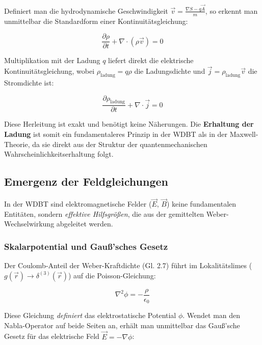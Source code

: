 Definiert man die hydrodynamische Geschwindigkeit $\vec{v} = \frac{\nabla S - q\vec{A}}{m}$, so erkennt man unmittelbar die Standardform einer Kontinuitätsgleichung:

\begin{equation}
    \frac{\partial \rho}{\partial t} + \nabla \cdot (\rho \vec{v}) = 0
\end{equation}

Multiplikation mit der Ladung $q$ liefert direkt die elektrische Kontinuitätsgleichung, wobei $\rho_{\text{ladung}} = q\rho$ die Ladungsdichte und $\vec{j} = \rho_{\text{ladung}} \vec{v}$ die Stromdichte ist:

\begin{equation}
    \frac{\partial \rho_{\text{ladung}}}{\partial t} + \nabla \cdot \vec{j} = 0
\end{equation}

Diese Herleitung ist exakt und benötigt keine Näherungen. Die \textbf{Erhaltung der Ladung} ist somit ein fundamentaleres Prinzip in der WDBT als in der Maxwell-Theorie, da sie direkt aus der Struktur der quantenmechanischen Wahrscheinlichkeitserhaltung folgt.

\subsection{Emergenz der Feldgleichungen}

In der WDBT sind elektromagnetische Felder ($\vec{E}$, $\vec{B}$) keine fundamentalen Entitäten, sondern \textit{effektive Hilfsgrößen}, die aus der gemittelten Weber-Wechselwirkung abgeleitet werden.

\subsubsection{Skalarpotential und Gauß'sches Gesetz}

Der Coulomb-Anteil der Weber-Kraftdichte (Gl. 2.7) führt im Lokalitätslimes ($g(\vec{r}) \rightarrow \delta^{(3)}(\vec{r})$)
 auf die Poisson-Gleichung:

\begin{equation}
    \nabla^2 \phi = -\frac{\rho}{\epsilon_0}
\end{equation}

Diese Gleichung \textit{definiert} das elektrostatische Potential $\phi$. Wendet man den Nabla-Operator auf beide Seiten an, erhält man unmittelbar das Gauß'sche Gesetz für das elektrische Feld $\vec{E} = -\nabla \phi$:

